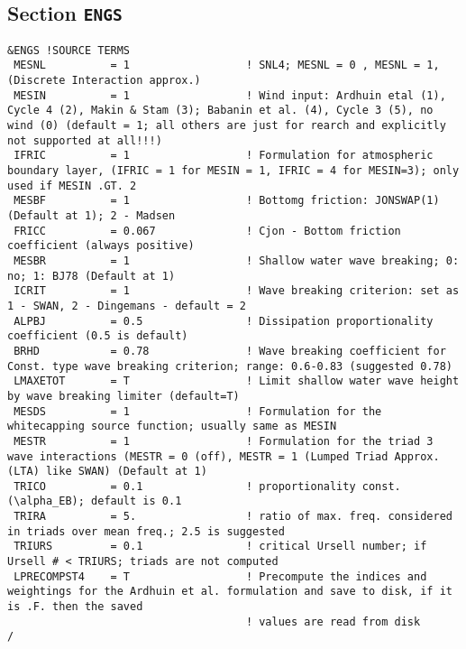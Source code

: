 \documentclass[12pt]{amsart}
\begin{document}
\subsection{Section {\tt ENGS}}
\begin{verbatim}
&ENGS !SOURCE TERMS
 MESNL          = 1                  ! SNL4; MESNL = 0 , MESNL = 1, (Discrete Interaction approx.)
 MESIN          = 1                  ! Wind input: Ardhuin etal (1), Cycle 4 (2), Makin & Stam (3); Babanin et al. (4), Cycle 3 (5), no wind (0) (default = 1; all others are just for rearch and explicitly not supported at all!!!)
 IFRIC          = 1                  ! Formulation for atmospheric boundary layer, (IFRIC = 1 for MESIN = 1, IFRIC = 4 for MESIN=3); only used if MESIN .GT. 2
 MESBF          = 1                  ! Bottomg friction: JONSWAP(1) (Default at 1); 2 - Madsen
 FRICC          = 0.067              ! Cjon - Bottom friction coefficient (always positive)
 MESBR          = 1                  ! Shallow water wave breaking; 0: no; 1: BJ78 (Default at 1)
 ICRIT          = 1                  ! Wave breaking criterion: set as 1 - SWAN, 2 - Dingemans - default = 2
 ALPBJ          = 0.5                ! Dissipation proportionality coefficient (0.5 is default)
 BRHD           = 0.78               ! Wave breaking coefficient for Const. type wave breaking criterion; range: 0.6-0.83 (suggested 0.78)
 LMAXETOT       = T                  ! Limit shallow water wave height by wave breaking limiter (default=T)
 MESDS          = 1                  ! Formulation for the whitecapping source function; usually same as MESIN
 MESTR          = 1                  ! Formulation for the triad 3 wave interactions (MESTR = 0 (off), MESTR = 1 (Lumped Triad Approx. (LTA) like SWAN) (Default at 1)
 TRICO          = 0.1                ! proportionality const. (\alpha_EB); default is 0.1
 TRIRA          = 5.                 ! ratio of max. freq. considered in triads over mean freq.; 2.5 is suggested
 TRIURS         = 0.1                ! critical Ursell number; if Ursell # < TRIURS; triads are not computed
 LPRECOMPST4    = T                  ! Precompute the indices and weightings for the Ardhuin et al. formulation and save to disk, if it is .F. then the saved
                                     ! values are read from disk
/
\end{verbatim}
\end{document}
